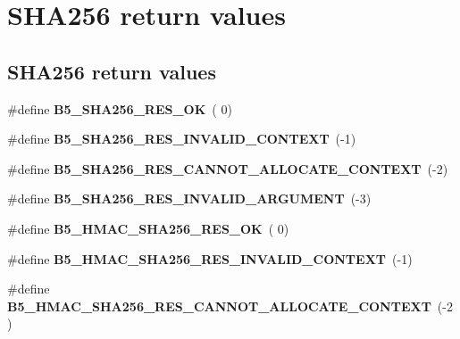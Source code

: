 \hypertarget{group__sha_return}{\section{S\-H\-A256 return values}
\label{group__sha_return}
}
\subsection*{S\-H\-A256 return values}
\begin{DoxyCompactItemize}
\item 
\hypertarget{group__sha_return_ga7d1f521833efb8c27c71c134cf099e9f}{\#define {\bfseries B5\-\_\-\-S\-H\-A256\-\_\-\-R\-E\-S\-\_\-\-O\-K}~( 0)}\label{group__sha_return_ga7d1f521833efb8c27c71c134cf099e9f}

\item 
\hypertarget{group__sha_return_gaab0b332fc7be98d727e732b2c984974c}{\#define {\bfseries B5\-\_\-\-S\-H\-A256\-\_\-\-R\-E\-S\-\_\-\-I\-N\-V\-A\-L\-I\-D\-\_\-\-C\-O\-N\-T\-E\-X\-T}~(-\/1)}\label{group__sha_return_gaab0b332fc7be98d727e732b2c984974c}

\item 
\hypertarget{group__sha_return_gabd460ee578289ba2248b144453b326b8}{\#define {\bfseries B5\-\_\-\-S\-H\-A256\-\_\-\-R\-E\-S\-\_\-\-C\-A\-N\-N\-O\-T\-\_\-\-A\-L\-L\-O\-C\-A\-T\-E\-\_\-\-C\-O\-N\-T\-E\-X\-T}~(-\/2)}\label{group__sha_return_gabd460ee578289ba2248b144453b326b8}

\item 
\hypertarget{group__sha_return_gabadde59be1b96d3db41cbeb368082786}{\#define {\bfseries B5\-\_\-\-S\-H\-A256\-\_\-\-R\-E\-S\-\_\-\-I\-N\-V\-A\-L\-I\-D\-\_\-\-A\-R\-G\-U\-M\-E\-N\-T}~(-\/3)}\label{group__sha_return_gabadde59be1b96d3db41cbeb368082786}

\item 
\hypertarget{group__sha_return_ga0e5f89b7755c8f732ed35deec05da229}{\#define {\bfseries B5\-\_\-\-H\-M\-A\-C\-\_\-\-S\-H\-A256\-\_\-\-R\-E\-S\-\_\-\-O\-K}~( 0)}\label{group__sha_return_ga0e5f89b7755c8f732ed35deec05da229}

\item 
\hypertarget{group__sha_return_ga3ff9a0202a85c089dc8bcf233ec1ab91}{\#define {\bfseries B5\-\_\-\-H\-M\-A\-C\-\_\-\-S\-H\-A256\-\_\-\-R\-E\-S\-\_\-\-I\-N\-V\-A\-L\-I\-D\-\_\-\-C\-O\-N\-T\-E\-X\-T}~(-\/1)}\label{group__sha_return_ga3ff9a0202a85c089dc8bcf233ec1ab91}

\item 
\hypertarget{group__sha_return_gacff6d96c063b8e79061f78d0635fea32}{\#define {\bfseries B5\-\_\-\-H\-M\-A\-C\-\_\-\-S\-H\-A256\-\_\-\-R\-E\-S\-\_\-\-C\-A\-N\-N\-O\-T\-\_\-\-A\-L\-L\-O\-C\-A\-T\-E\-\_\-\-C\-O\-N\-T\-E\-X\-T}~(-\/2)}\label{group__sha_return_gacff6d96c063b8e79061f78d0635fea32}


\end{DoxyCompactItemize}
